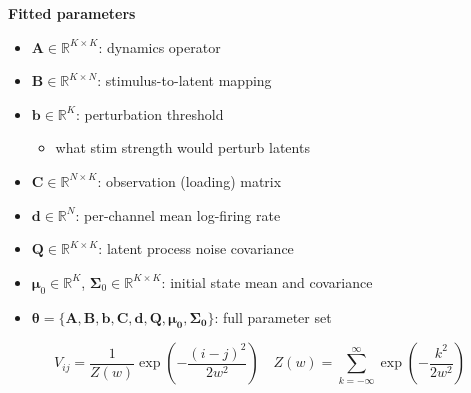 \documentclass[11pt,letterpaper]{article} %
\begin{document}
\begin{minipage}[t]{0.47\textwidth}
\textbf{Fitted parameters}
\begin{itemize}[leftmargin=*, itemsep=0.3em]
    \item $\bm{A} \in \mathbb{R}^{K \times K}$: dynamics operator
    \item $\bm{B} \in \mathbb{R}^{K \times N}$: stimulus-to-latent mapping
    \item $\bm{b} \in \mathbb{R}^{K}$: perturbation threshold
        \begin{itemize}[itemsep=0em, topsep=0em]
            \item[$-$] what stim strength would perturb latents
        \end{itemize}
    \item $\bm{C} \in \mathbb{R}^{N \times K}$: observation (loading) matrix
    \item $\bm{d} \in \mathbb{R}^{N}$: per-channel mean log-firing rate
    \item $\bm{Q} \in \mathbb{R}^{K \times K}$: latent process noise covariance
    \item $\bm{\mu}_0 \in \mathbb{R}^K$, $\boldsymbol{\Sigma}_0 \in \mathbb{R}^{K \times K}$: initial state mean and covariance
    \item $\bm{\theta} = \{\bm{A, B, b, C, d, Q, \mu_0, \Sigma_0}\}$: full parameter set
\end{itemize}
\end{minipage}
\[
    V_{ij} = \frac{1}{Z(w)}\exp\!\left(-\frac{(i-j)^2}{2w^2}\right) \quad
    Z(w) = \sum_{k=-\infty}^{\infty}\exp\!\left(-\frac{k^2}{2w^2}\right)
\]

\end{document}
